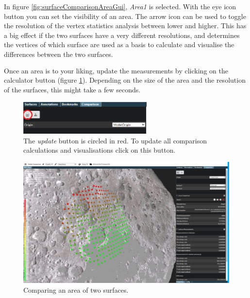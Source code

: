 In figure \ref{fig:surfaceComparisonAreaGui}, \emph{Area1} is selected. With the eye icon button you can set the visibility of an area. The arrow icon can be used to toggle the resolution of the vertex statistics analysis between lower and higher. This has a big effect if the two surfaces have a very different resolutions, and determines the vertices of which surface are used as a basis to calculate and visualise the differences between the two surfaces.

Once an area is to your liking, update the measurements by clicking on the calculator button (figure \ref{surfaceComparisonAreaUpdButton.PNG}). Depending on the size of the area and the resolution of the surfaces, this might take a few seconds.

\begin{figure}[h]
	\centering
	\includegraphics[width=0.6\textwidth]{pics/surfaceComparisonAreaUpdButton.PNG}
	\caption[The update button.]{The \emph{update} button is circled in red. To update all comparison calculations and visualisations click on this button.}
	\label{surfaceComparisonAreaUpdButton.PNG}
\end{figure}

\begin{figure}[h]
	\centering
	\includegraphics[width=1.0\textwidth]{pics/surfaceComparisonArea3DView1.PNG}
	\caption[Comparing an area of two surfaces.]{Comparing an area of two surfaces.}
	\label{surfaceComparisonArea3DView1.PNG}
\end{figure}

